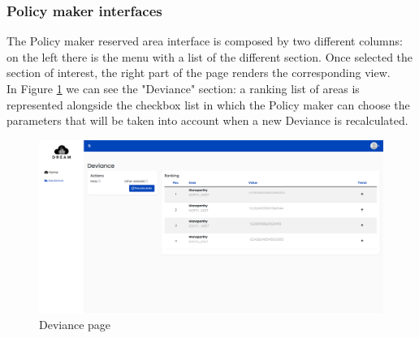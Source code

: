 \subsubsection{Policy maker interfaces}
The Policy maker reserved area interface is composed by two different columns: on the left there is the menu with a list of the different section. Once selected the section of interest, the right part of the page renders the corresponding view.\\ In Figure \ref{fig:deviance_page} we can see the "Deviance" section: a ranking list of areas is represented alongside the checkbox list in which the Policy maker can choose the parameters that will be taken into account when a new Deviance is recalculated.
\begin{figure}[h!]
    \centering
    \includegraphics[scale=0.2]{images/interfaces/deviance.png}
    \caption{Deviance page}
    \label{fig:deviance_page}
\end{figure}
\FloatBarrier


